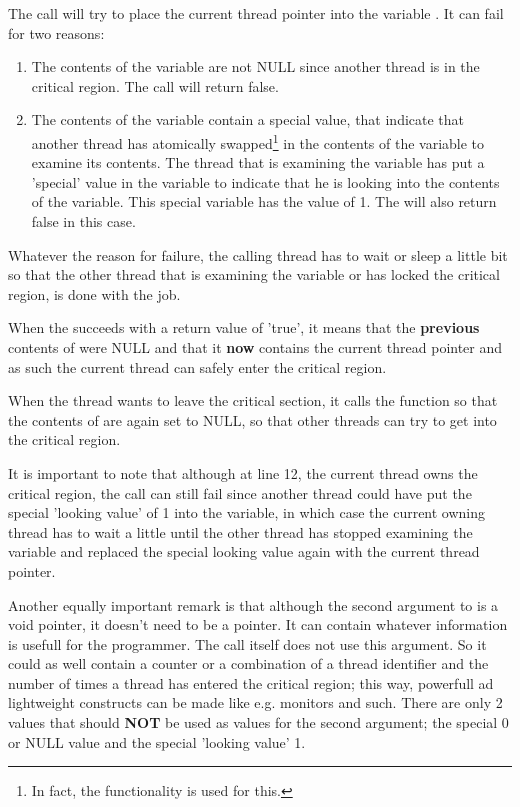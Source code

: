 The  call will try to place the current thread
pointer into the variable . It can fail for two reasons:

\begin{enumerate}
\item The contents of the  variable are not NULL since another
thread is in the critical region. The  call will
return false.
\item The contents of the  variable contain a special value,
that indicate that another thread has atomically swapped\footnote{In fact,
the  functionality is used for this.} in the contents of
the  variable to examine its contents. The thread that is
examining the  variable has put a 'special' value in the
 variable to indicate that he is looking into the contents of
the  variable. This special variable has the value of 1. The
 will also return false in this case.
\end{enumerate}

Whatever the reason for failure, the calling thread has to wait or sleep a little
bit so that the other thread that is examining the variable or has locked the
critical region, is done with the job.

When the  succeeds with a return value of 'true',
it means that the \textbf{previous} contents of  were NULL and that it
\textbf{now} contains the current thread
pointer and as such the current thread can safely enter the critical region.

When the thread wants to leave the critical section, it calls the
 function so that the contents of  are
again set to NULL, so that other threads can try to get into the critical
region.

It is important to note that although at line 12, the current thread owns
the critical region, the  call can still fail since
another thread could have put the special 'looking value' of 1 into the
 variable, in which case the current owning thread has to wait
a little until the other thread has stopped examining the 
variable and replaced the special looking value again with the current
thread pointer.

Another equally important remark is that although the second argument to
 is a void pointer, it doesn't need to be a
pointer. It can contain whatever information is usefull for the programmer.
The call itself does not use this argument. So it could as well contain a
counter or a combination of a thread identifier and the number of times a
thread has entered the critical region; this way, powerfull ad lightweight constructs
can be made like e.g. monitors and such. There are only 2 values that should
\textbf{NOT} be used as values for the second argument; the special 0 or
NULL value and the special 'looking value' 1.

